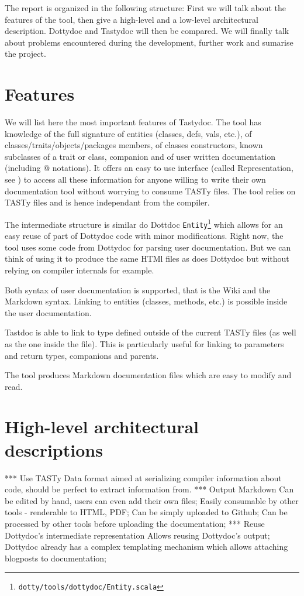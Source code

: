 \documentclass{report}
\begin{document}
The report is organized in the following structure: First we will talk about the features of the tool, then give a high-level and a low-level architectural description. Dottydoc and Tastydoc will then be compared. We will finally talk about problems encountered during the development, further work and sumarise the project.

\chapter{Features}
We will list here the most important features of Tastydoc. The tool has knowledge of the full signature of entities (classes, defs, vals, etc.), of classes/traits/objects/packages members, of classes constructors, known subclasses of a trait or class, companion and of user written documentation (including @ notations). It offers an easy to use interface (called Representation, see ) to access all these information for anyone willing to write their own documentation tool without worrying to consume TASTy files. The tool relies on TASTy files and is hence independant from the compiler.

The intermediate structure is similar do Dottdoc \texttt{Entity}\footnote{\texttt{dotty/tools/dottydoc/Entity.scala}} which allows for an easy reuse of part of Dottydoc code with minor modifications. Right now, the tool uses some code from Dottydoc for parsing user documentation. But we can think of using it to produce the same HTMl files as does Dottydoc but without relying on compiler internals for example.

Both syntax of user documentation is supported, that is the Wiki and the Markdown syntax. Linking to entities (classes, methods, etc.) is possible inside the user documentation.

Tastdoc is able to link to type defined outside of the current TASTy files (as well as the one inside the file). This is particularly useful for linking to parameters and return types, companions and parents.

The tool produces Markdown documentation files which are easy to modify and read.

\chapter{High-level architectural descriptions}
*** Use TASTy
Data format aimed at serializing compiler information about code,
should be perfect to extract information from.
*** Output Markdown
Can be edited by hand, users can even add their own files;
Easily consumable by other tools - renderable to HTML, PDF;
Can be simply uploaded to Github;
Can be processed by other tools before uploading the documentation;
*** Reuse Dottydoc's intermediate representation
Allows reusing Dottydoc's output;
Dottydoc already has a complex templating mechanism which allows 
attaching blogposts to documentation;
\end{document}
